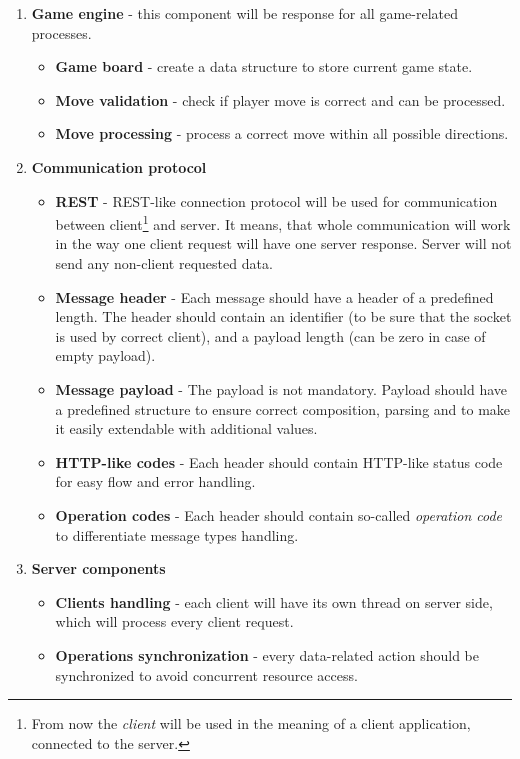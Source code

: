 \documentclass[english, sem, kiv, he, iso690alph, pdf, viewonly]{fasthesis}
\begin{document}
\begin{enumerate}
	\item \textbf{Game engine} - this component will be response for all game-related processes.
		\begin{itemize}
			\item \textbf{Game board}  - create a data structure to store current game state.
			\item \textbf{Move validation} - check if player move is correct and can be processed.
			\item \textbf{Move processing} - process a correct move within all possible directions.
		\end{itemize}

	\item \textbf{Communication protocol}
		\begin{itemize}
			\item \textbf{\ac{REST}} - \ac{REST}-like connection protocol will be used for communication between client\footnote{From now the \textit{client} will be used in the meaning of a client application, connected to the server.} and server. It means, that whole communication will work in the way one client request will have one server response. Server will not send any non-client requested data.
			\item \textbf{Message header} - Each message should have a header of a predefined length. The header should contain an identifier (to be sure that the socket is used by correct client), and a payload length (can be zero in case of empty payload).
			\item \textbf{Message payload} - The payload is not mandatory. Payload should have a predefined structure to ensure correct composition, parsing and to make it easily extendable with additional values.
			\item \textbf{HTTP-like codes} - Each header should contain HTTP-like status code for easy flow and error handling.
			\item \textbf{Operation codes} - Each header should contain so-called \textit{operation code} to differentiate message types handling.
		\end{itemize}
	\item \textbf{Server components}
		\begin{itemize}
			\item \textbf{Clients handling} - each client will have its own thread on server side, which will process every client request.
			\item \textbf{Operations synchronization} - every data-related action should be synchronized to avoid concurrent resource access.

\end{itemize}
\end{enumerate}
\end{document}

